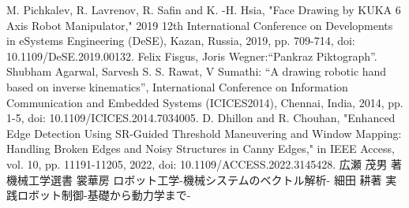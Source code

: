 \newlength{\oldbaselineskip}
\begin{thebibliography}{99}
	M. Pichkalev, R. Lavrenov, R. Safin and K. -H. Hsia, "Face Drawing by KUKA 6 Axis Robot Manipulator," 2019 12th International Conference on Developments in eSystems Engineering (DeSE), Kazan, Russia, 2019, pp. 709-714, doi: 10.1109/DeSE.2019.00132.
	 Felix Fisgus, Joris Wegner:``Pankraz Piktograph''.
	 Shubham Agarwal, Sarvesh S. S. Rawat, V Sumathi: ``A drawing robotic hand based on inverse kinematics'', International Conference on Information Communication and Embedded Systems (ICICES2014), Chennai, India, 2014, pp. 1-5, doi: 10.1109/ICICES.2014.7034005.
	D. Dhillon and R. Chouhan, "Enhanced Edge Detection Using SR-Guided Threshold Maneuvering and Window Mapping: Handling Broken Edges and Noisy Structures in Canny Edges," in IEEE Access, vol. 10, pp. 11191-11205, 2022, doi: 10.1109/ACCESS.2022.3145428.
	広瀬 茂男 著 機械工学選書 裳華房 ロボット工学-機械システムのベクトル解析-
	細田 耕著 実践ロボット制御-基礎から動力学まで-
\end{thebibliography}
